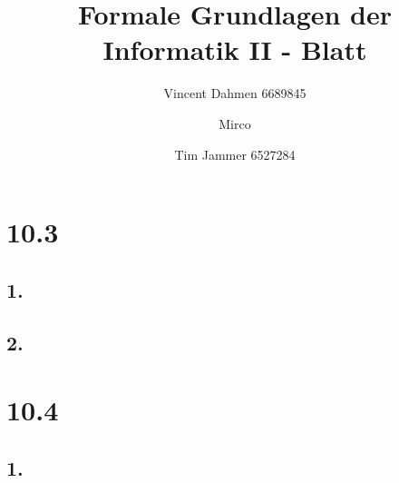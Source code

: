 \documentclass[12pt,a4paper]{article}
\title{Formale Grundlagen der Informatik II - Blatt \blattNr}
\author{Vincent Dahmen 6689845  \and Mirco \and Tim Jammer 6527284}
\def \blattNr{10}
\begin{document}
\maketitle{}

\section*{\blattNr .3}
\subsection*{1.}



\subsection*{2.}


%

%

%
%
%

\pagebreak

\section*{\blattNr .4}

\subsection*{1.}


%
\end{document}
